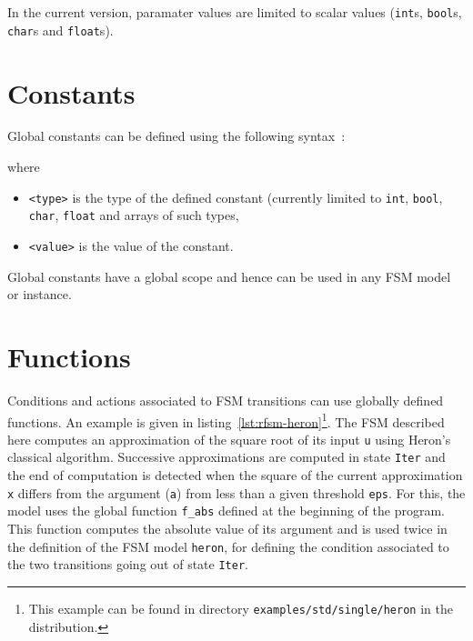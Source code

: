 \medskip
In the current version, paramater values are limited to scalar values (\texttt{int}s,
\texttt{bool}s, \texttt{char}s and \texttt{float}s). 




\section{Constants}
\label{sec:constants}

Global constants can be defined using the following syntax~:  

\begin{center}
\end{center}

\noindent
where
\begin{itemize}
\item \lstinline[language=Rfsm]|<type>| is the type of the defined constant (currently limited to
  \verb|int|, \verb|bool|, \verb|char|, \verb|float| and arrays of such types,
\item \lstinline[language=Rfsm]|<value>| is the value of the constant.
\end{itemize}

Global constants have a global scope and hence can be used in any FSM model or instance.

\section{Functions}
\label{sec:functions}

Conditions and actions associated to FSM transitions can use globally defined functions. An example
is given in listing~\ref{lst:rfsm-heron}\footnote{This example can be found in directory
  \texttt{examples/std/single/heron} in the distribution.}. The FSM described here computes an approximation
of the square root of its input \verb|u| using Heron's classical algorithm. Successive approximations are computed in
state \verb|Iter| and the end of computation is detected when the square of the current
approximation \verb|x| differs from the argument (\verb|a|) from less than a given threshold
\verb|eps|. For this, the model uses the global function \verb|f_abs| defined at the beginning of
the program. This function computes the absolute value of its argument and is used twice in the
definition of the FSM model \verb|heron|, for defining the condition associated to the two
transitions going out of state \verb|Iter|.

